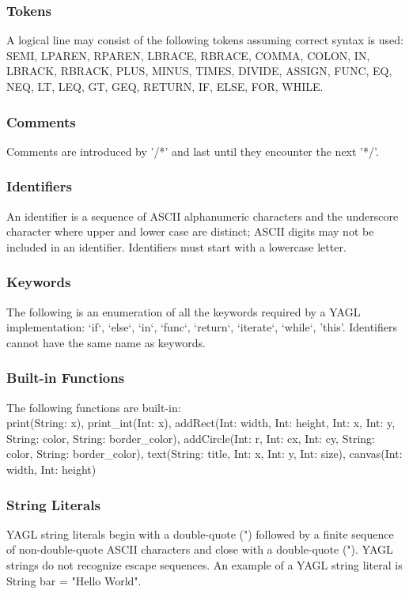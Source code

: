 \documentclass[12pt]{article}
\begin{document}
\subsubsection{Tokens}
A logical line may consist of the following tokens assuming correct syntax is used: \\
SEMI, LPAREN, RPAREN, LBRACE, RBRACE, COMMA, COLON, IN, LBRACK, RBRACK, PLUS, MINUS, TIMES, DIVIDE, ASSIGN, FUNC, EQ, NEQ, LT, LEQ, GT, GEQ, RETURN, IF, ELSE, FOR, WHILE. 

\subsubsection{Comments} 
Comments are introduced by '/*' and last until they encounter the next '*/'.

\subsubsection{Identifiers}
An identifier is a sequence of ASCII alphanumeric characters and the underscore character where upper and lower case are distinct; ASCII digits may not be included in an identifier.  Identifiers must start with a lowercase letter.

\subsubsection{Keywords}
The following is an enumeration of all the keywords required by a YAGL implementation:
`if`, `else`, `in`, `func`, `return`, `iterate`, `while`, 'this'.  Identifiers cannot have the same name as keywords.

\subsubsection{Built-in Functions}
The following functions are built-in:\\
print(String: x), print\_int(Int: x), addRect(Int: width, Int: height, Int: x, Int: y, String: color, String: border\_color), addCircle(Int: r, Int: cx, Int: cy, String: color, String: border\_color), text(String: title, Int: x, Int: y, Int: size), canvas(Int: width, Int: height)

\subsubsection{String Literals}
YAGL string literals begin with a double-quote (") followed by a finite sequence of non-double-quote ASCII characters and close with a double-quote ("). YAGL strings do not recognize escape sequences. An example of a YAGL string literal is String bar = "Hello World".
\end{document}
